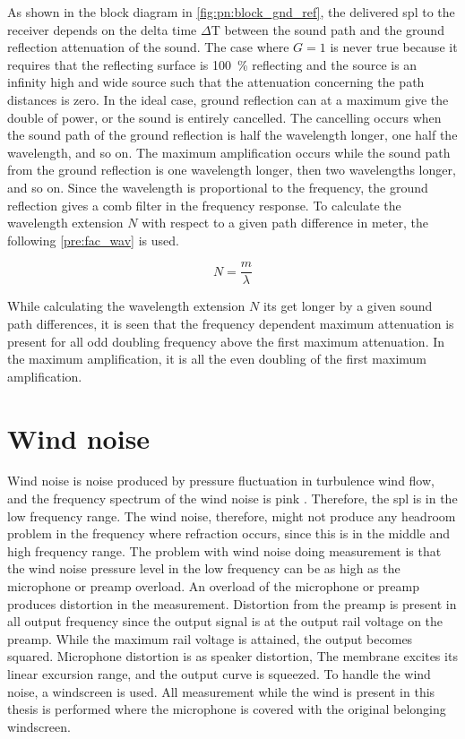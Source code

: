 As shown in the block diagram in \autoref{fig:pn:block_gnd_ref}, the delivered \gls{spl} to the receiver depends on the delta time $\Delta$T between the sound path and the ground reflection attenuation of the sound. The case where $G=1$ is never true because it requires that the reflecting surface is \SI{100}{\percent} reflecting and the source is an infinity high and wide source such that the attenuation concerning the path distances is zero. In the ideal case, ground reflection can at a maximum give the double of power,  or the sound is entirely cancelled. The cancelling occurs when the sound path of the ground reflection is half the wavelength longer, one half the wavelength, and so on. The maximum amplification occurs while the sound path from the ground reflection is one wavelength longer, then two wavelengths longer, and so on. Since the wavelength is proportional to the frequency, the ground reflection gives a comb filter in the frequency response. To calculate the wavelength extension $N$ with respect to a given path difference in meter, the following \autoref{pre:fac_wav} is used.

\begin{equation}\label{pre:fac_wav}
N = \frac{m}{\lambda}
\end{equation}  

\startexplain
{}
\stopexplain


While calculating the wavelength extension $N$ its get longer by a given sound path differences, it is seen that the frequency dependent maximum attenuation is present for all odd doubling frequency above the first maximum attenuation. In the maximum amplification, it is all the even doubling of the first maximum amplification.


\section{Wind noise}\label{pre:wind_noise}
Wind noise is noise produced by pressure fluctuation in turbulence wind flow, and the frequency spectrum of the wind noise is pink \citep{doi:10.1121/1.4780400}. Therefore, the \gls{spl} is in the low frequency range. The wind noise, therefore, might not produce any headroom problem in the frequency where refraction occurs, since this is in the middle and high frequency range. The problem with wind noise doing measurement is that the wind noise pressure level in the low frequency can be as high as the microphone or preamp overload. An overload of the microphone or preamp produces distortion in the measurement. Distortion from the preamp is present in all output frequency since the output signal is at the output rail voltage on the preamp. While the maximum rail voltage is attained, the output becomes squared. Microphone distortion is as speaker distortion, The membrane excites its linear excursion range, and the output curve is squeezed. To handle the wind noise, a windscreen is used. All measurement while the wind is present in this thesis is performed where the microphone is covered with the original belonging windscreen.  

 